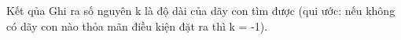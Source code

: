 Kết qủa  
Ghi ra số nguyên k là độ dài của dãy con tìm được (qui ước: nếu không có dãy con nào thỏa mãn điều kiện đặt ra thì k = -1).